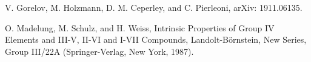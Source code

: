 \begin{thebibliography}{99}
 V. Gorelov, M. Holzmann, D. M. Ceperley, and C. Pierleoni, arXiv: 1911.06135.

 O. Madelung, M. Schulz, and H. Weiss, Intrinsic
Properties of Group IV Elements and III-V, II-VI and
I-VII Compounds, Landolt-B\"{o}rnstein, New Series, Group
III/22A (Springer-Verlag, New York, 1987).

\end{thebibliography}